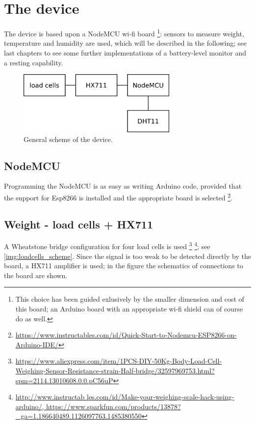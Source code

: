 \section{The device}
The device is based upon a NodeMCU wi-fi board \footnote{This choice has been guided exlusively by the smaller dimension and cost of this board; an Arduino board with an appropriate wi-fi shield can of course do as well.}: sensors to measure weight, temperature and humidity are used, which will be described in the following; see last chapters to see some further implementations of a battery-level monitor and a resting capability.

\begin{figure} 
  \centering
  \includegraphics[width=0.7\textwidth]{latex/img/device_scheme.png}
  \caption{General scheme of the device.}\label{img:loadcells_scheme}
\end{figure}

\subsection{NodeMCU}
Programming the NodeMCU is as easy as writing Arduino code, provided that the support for Esp8266 is installed and the appropriate board is selected \footnote{\url{https://www.instructables.com/id/Quick-Start-to-Nodemcu-ESP8266-on-Arduino-IDE/}}.

\subsection{Weight - load cells + HX711}
A Wheatstone bridge configuration for four load cells is used \footnote{\url{https://www.aliexpress.com/item/1PCS-DIY-50Kg-Body-Load-Cell-Weighing-Sensor-Resistance-strain-Half-bridge/32597969753.html?spm=2114.13010608.0.0.pC56uP}} \footnote{\url{http://www.instructab
les.com/id/Make-your-weighing-scale-hack-using-arduino/, https://www.sparkfun.com/products/13878?_ga=1.186640489.1126097763.1485380550}}; see \autoref{img:loadcells_scheme}. Since the signal is too weak to be detected directly by the board, a HX711 amplifier is used; in the figure the schematics of connections to the board are shown.


